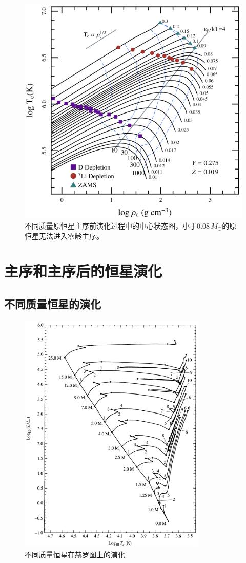 \documentclass[openany]{ctexbook}
\begin{document}
\begin{figure}[hbt]
  \centering
  \includegraphics[width=12cm]{chapters/12/prems}
  \caption{不同质量原恒星主序前演化过程中的中心状态图，小于$0.08\,M_\odot$的原恒星无法进入零龄主序。}
  \label{}
\end{figure}

\chapter{主序和主序后的恒星演化}\label{sec:evolution}
\section{不同质量恒星的演化}
\begin{figure}[hbt]
  \centering
  \includegraphics[width=9cm]{chapters/13/HRD}
  \caption{不同质量恒星在赫罗图上的演化}
  \label{fig:HRDM}
\end{figure}
\end{document}
